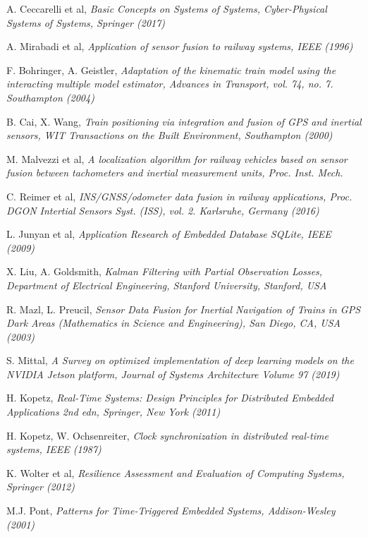 \begin{thebibliography}{9}
A. Ceccarelli et al, \emph{Basic Concepts on Systems of Systems, Cyber-Physical Systems of Systems, Springer (2017)}


A. Mirabadi et al, \textit{Application of sensor fusion to railway systems, IEEE (1996)}

F. Bohringer, A. Geistler, \textit{Adaptation of the kinematic train
	model using the interacting multiple model estimator, Advances in
	Transport, vol. 74, no. 7. Southampton (2004)}

B. Cai, X. Wang, \textit{Train positioning via integration and
fusion of GPS and inertial sensors, WIT Transactions on the Built Environment, Southampton (2000)}

M. Malvezzi et al, \textit{A localization algorithm for railway vehicles based on sensor fusion between tachometers and inertial measurement units, Proc. Inst. Mech.}

C. Reimer et al, \textit{INS/GNSS/odometer
data fusion in railway applications, Proc. DGON Intertial Sensors
Syst. (ISS), vol. 2. Karlsruhe, Germany (2016)} 

L. Junyan et al, \textit{Application Research of Embedded Database SQLite, IEEE (2009)}

X. Liu, A. Goldsmith, \textit{
Kalman  Filtering with Partial Observation Losses, Department of Electrical Engineering, Stanford University, Stanford, USA}

R. Mazl, L. Preucil, \textit{Sensor Data Fusion for Inertial Navigation of
Trains in GPS Dark Areas (Mathematics in Science and Engineering),
San Diego, CA, USA (2003)}

S. Mittal, \textit{A Survey on optimized implementation of deep learning models on the NVIDIA Jetson platform, Journal of Systems Architecture
Volume 97 (2019)}
	

H. Kopetz, \textit{Real-Time Systems: Design Principles for Distributed Embedded Applications 2nd edn, Springer, New York (2011)}

H. Kopetz, W. Ochsenreiter, \textit{Clock synchronization in distributed real-time systems, IEEE (1987)}

K. Wolter et al,
\textit{Resilience Assessment and Evaluation of Computing Systems, Springer (2012)}

M.J. Pont, \emph{Patterns for Time-Triggered Embedded Systems, Addison-Wesley (2001)}


\end{thebibliography}
